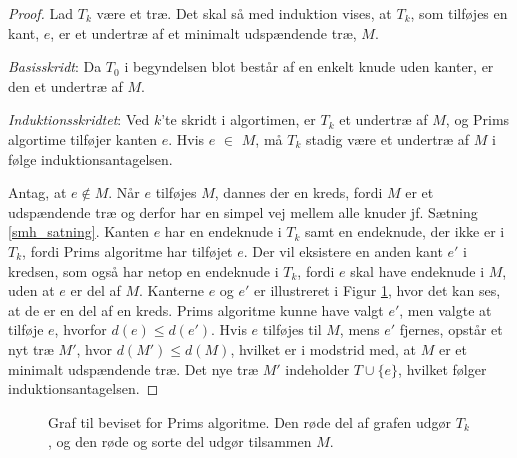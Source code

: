 \begin{proof}
Lad $T_{k}$ være et træ. Det skal så med induktion vises, at $T_{k}$, som tilføjes en kant, $e$, er et undertræ af et minimalt udspændende træ, $M$. 

\textit{Basisskridt}: Da $T_0$ i begyndelsen blot består af en enkelt knude uden kanter, er den et undertræ af $M$.

\textit{Induktionsskridtet}: Ved $k$'te skridt i algortimen, er $T_k$ et undertræ af $M$, og Prims algortime tilføjer kanten $e$. Hvis $e$ $\in$ $M$, må $T_k$ stadig være et undertræ af $M$ i følge induktionsantagelsen.

Antag, at $e \notin M$. Når $e$ tilføjes $M$, dannes der en kreds, fordi $M$ er et udspændende træ og derfor har en simpel vej mellem alle knuder jf. Sætning \ref{smh_satning}.
Kanten $e$ har en endeknude i $T_k$ samt en endeknude, der ikke er i $T_k$, fordi Prims algoritme har tilføjet $e$. 
Der vil eksistere en anden kant $e'$ i kredsen, som også har netop en endeknude i $T_k$, fordi $e$ skal have endeknude i $M$, uden at $e$ er del af $M$. 
Kanterne $e$ og $e'$ er illustreret i Figur \ref{graf_prim_bevis}, hvor det kan ses, at de er en del af en kreds. 
Prims algoritme kunne have valgt $e'$, men valgte at tilføje $e$, hvorfor $d(e) \leq d(e')$. 
Hvis $e$ tilføjes til $M$, mens $e'$ fjernes, opstår et nyt træ $M'$, hvor 
$d(M') \leq d(M)$, hvilket er i modstrid med, at $M$ er et minimalt udspændende træ. Det nye træ $M'$ indeholder $T\cup \lbrace e \rbrace$, hvilket følger induktionsantagelsen. 
\end{proof}

\begin{figure}[h]
\centering

\caption{Graf til beviset for Prims algoritme. Den røde del af grafen udgør $T_k$, og den røde og sorte del udgør tilsammen $M$.  } 
\label{graf_prim_bevis}
\end{figure}
